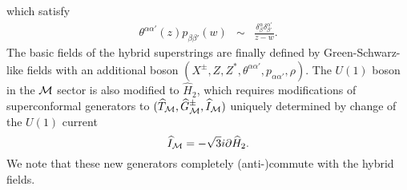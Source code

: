 \documentclass[a4paper,seceq,preprint]{ptptex}
\begin{document}
which satisfy
\begin{eqnarray}
 \theta^{\alpha\alpha'}(z)p_{\beta\beta'}(w)&\sim&
\frac{\delta^\alpha_\beta\delta^{\alpha'}_{\beta'}}{z-w}.
\end{eqnarray}
The basic fields of the hybrid superstrings are 
finally defined by Green-Schwarz-like fields with 
an additional boson  $(X^\pm,Z,Z^*,\theta^{\alpha\alpha'},
p_{\alpha\alpha'},\rho)$. 
The $U(1)$ boson in the ${\cal M}$ sector is also 
modified to $\widehat H_2$, which requires modifications of 
superconformal generators to 
$(\widehat T_{\cal M}, \widehat G^\pm_{\cal M}, 
\widehat I_{\cal M})$ uniquely determined by change of 
the $U(1)$ current
\begin{equation}
 \widehat I_{\cal M}=-\sqrt{3}i\partial\widehat H_2.
\end{equation}
We note that these new generators completely (anti-)commute 
with the hybrid fields.
\end{document}
